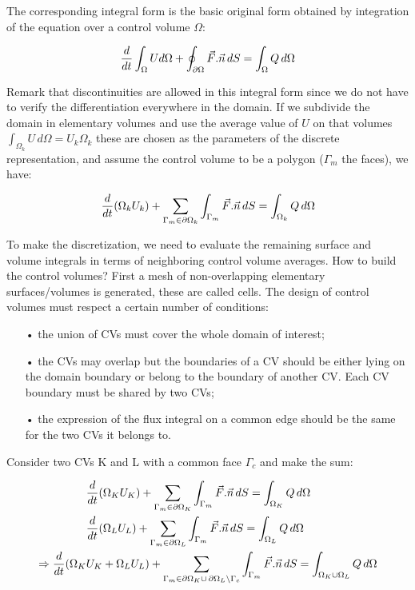 The corresponding integral form is the basic original form obtained by integration of the equation over a control volume $\Omega$: 

\begin{equation}
\frac{d}{dt}\int _\Omega U d\Omega + \oint _{\partial \Omega} \vec{F}.\vec{n}\, dS = \int _{\Omega} Q \, d\Omega
\end{equation}

Remark that discontinuities are allowed in this integral form since we do not have to verify the differentiation everywhere in the domain. If we subdivide the domain in elementary volumes and use the average value of $U$ on that volumes $\int _{\Omega _k}U\, d\Omega = U_k \Omega _k$ these are chosen as the parameters of the discrete representation, and assume the control volume to be a polygon ($\Gamma _m$ the faces), we have: 

\begin{equation}
\frac{d}{dt}(\Omega _k U_k) + \sum _{\Gamma _m \in \partial \Omega _k} \int _{\Gamma _m} \vec{F}.\vec{n}\, dS = \int _{\Omega _k}Q\, d\Omega
\end{equation}

To make the discretization, we need to evaluate the remaining surface and volume integrals in terms of neighboring control volume averages. How to build the control volumes? First a mesh of non-overlapping elementary surfaces/volumes is generated, these are called cells. The design of control volumes must respect a certain number of conditions: \\

\begin{itemize}
\item[•] the union of CVs must cover the whole domain of interest; 
\item[•] the CVs may overlap but the boundaries of a CV should be either lying on the domain boundary or belong to the boundary of another CV. Each CV boundary must be shared by two CVs;
\item[•] the expression of the flux integral on a common edge should be the same for the two CVs it belongs to. \\
\end{itemize}

Consider two CVs K and L with a common face $\Gamma _c$ and make the sum: 

\begin{equation}
\begin{aligned}
&\frac{d}{dt}(\Omega _K U_K) + \sum _{\Gamma _m \in \partial \Omega _K} \int _{\Gamma _m} \vec{F}.\vec{n}\, dS = \int _{\Omega _K}Q\, d\Omega \\
 &\frac{d}{dt}(\Omega _L U_L) + \sum _{\Gamma _m \in \partial \Omega _L} \int _{\Gamma _m} \vec{F}.\vec{n}\, dS = \int _{\Omega _L}Q\, d\Omega\\
 \Rightarrow \frac{d}{dt}(\Omega _K &U_K + \Omega _L U_L) + \sum _{\Gamma _m \in \partial \Omega _K \cup\, \partial\Omega _L \setminus \Gamma _c} \int _{\Gamma _m} \vec{F}.\vec{n}\, dS = \int _{\Omega _K\cup \Omega _L}Q\, d\Omega 
\end{aligned}
\end{equation}

